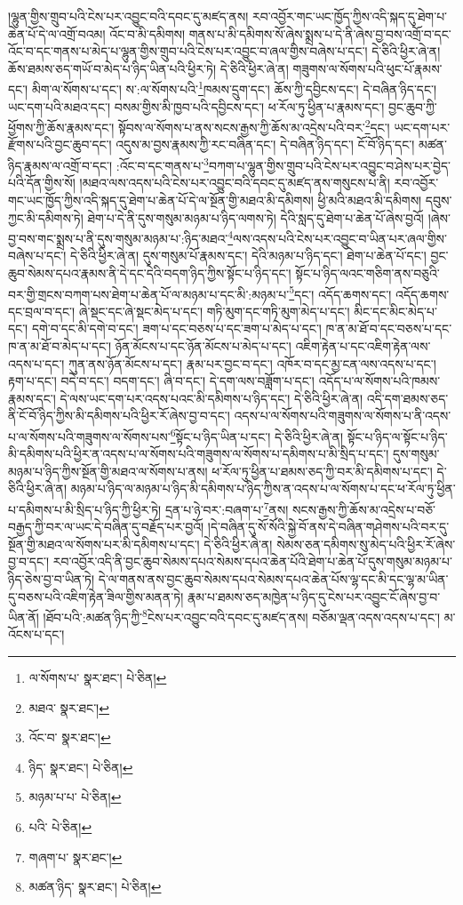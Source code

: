 །ལྷུན་གྱིས་གྲུབ་པའི་ངེས་པར་འབྱུང་བའི་དབང་དུ་མཛད་ནས། རབ་འབྱོར་གང་ཡང་ཁྱོད་ཀྱིས་འདི་སྐད་དུ་ཐེག་པ་ཆེན་པོ་དེ་ལ་འགྲོ་བའམ། འོང་བ་མི་དམིགས། གནས་པ་མི་དམིགས་སོ་ཞེས་སྨྲས་པ་དེ་ནི་ཞེས་བྱ་བས་འགྲོ་བ་དང་འོང་བ་དང་གནས་པ་མེད་པ་ལྷུན་གྱིས་གྲུབ་པའི་ངེས་པར་འབྱུང་བ་ཞལ་གྱིས་བཞེས་པ་དང་། དེ་ཅིའི་ཕྱིར་ཞེ་ན། ཆོས་ཐམས་ཅད་གཡོ་བ་མེད་པ་ཉིད་ཡིན་པའི་ཕྱིར་ཏེ། དེ་ཅིའི་ཕྱིར་ཞེ་ན། གཟུགས་ལ་སོགས་པའི་ཕུང་པོ་རྣམས་དང་། མིག་ལ་སོགས་པ་དང་། ས་:ལ་སོགས་པའི་\footnote{ལ་སོགས་པ་  སྣར་ཐང་།  པེ་ཅིན། }ཁམས་དྲུག་དང་། ཆོས་ཀྱི་དབྱིངས་དང་། དེ་བཞིན་ཉིད་དང་། ཡང་དག་པའི་མཐའ་དང་། བསམ་གྱིས་མི་ཁྱབ་པའི་དབྱིངས་དང་། ཕ་རོལ་ཏུ་ཕྱིན་པ་རྣམས་དང་། བྱང་ཆུབ་ཀྱི་ཕྱོགས་ཀྱི་ཆོས་རྣམས་དང་། སྟོབས་ལ་སོགས་པ་ནས་སངས་རྒྱས་ཀྱི་ཆོས་མ་འདྲེས་པའི་བར་\footnote{མཐའ་  སྣར་ཐང་། }དང་། ཡང་དག་པར་རྫོགས་པའི་བྱང་ཆུབ་དང་། འདུས་མ་བྱས་རྣམས་ཀྱི་རང་བཞིན་དང་། དེ་བཞིན་ཉིད་དང་། ངོ་བོ་ཉིད་དང་། མཚན་ཉིད་རྣམས་ལ་འགྲོ་བ་དང་། :འོང་བ་དང་གནས་པ་\footnote{འོང་བ་  སྣར་ཐང་། }བཀག་པ་ལྷུན་གྱིས་གྲུབ་པའི་ངེས་པར་འབྱུང་བ་ཤེས་པར་བྱེད་པའི་དོན་གྱིས་སོ། །མཐའ་ལས་འདས་པའི་ངེས་པར་འབྱུང་བའི་དབང་དུ་མཛད་ནས་གསུངས་པ་ནི། རབ་འབྱོར་གང་ཡང་ཁྱོད་ཀྱིས་འདི་སྐད་དུ་ཐེག་པ་ཆེན་པོ་དེ་ལ་སྔོན་གྱི་མཐའ་མི་དམིགས། ཕྱི་མའི་མཐའ་མི་དམིགས། དབུས་ཀྱང་མི་དམིགས་ཏེ། ཐེག་པ་དེ་ནི་དུས་གསུམ་མཉམ་པ་ཉིད་ལགས་ཏེ། དེའི་སླད་དུ་ཐེག་པ་ཆེན་པོ་ཞེས་བྱའོ། །ཞེས་བྱ་བས་གང་སྨྲས་པ་ནི་དུས་གསུམ་མཉམ་པ་:ཉིད་མཐའ་\footnote{ཉིད་  སྣར་ཐང་།  པེ་ཅིན། }ལས་འདས་པའི་ངེས་པར་འབྱུང་བ་ཡིན་པར་ཞལ་གྱིས་བཞེས་པ་དང་། དེ་ཅིའི་ཕྱིར་ཞེ་ན། དུས་གསུམ་པོ་རྣམས་དང་། དེའི་མཉམ་པ་ཉིད་དང་། ཐེག་པ་ཆེན་པོ་དང་། བྱང་ཆུབ་སེམས་དཔའ་རྣམས་ནི་དེ་དང་དེའི་བདག་ཉིད་ཀྱིས་སྟོང་པ་ཉིད་དང་། སྟོང་པ་ཉིད་ལའང་གཅིག་ནས་བཅུའི་བར་གྱི་གྲངས་བཀག་པས་ཐེག་པ་ཆེན་པོ་ལ་མཉམ་པ་དང་མི་:མཉམ་པ་\footnote{མཉམ་པ་པ་  པེ་ཅིན། }དང་། འདོད་ཆགས་དང་། འདོད་ཆགས་དང་བྲལ་བ་དང་། ཞེ་སྡང་དང་ཞེ་སྡང་མེད་པ་དང་། གཏི་མུག་དང་གཏི་མུག་མེད་པ་དང་། མིང་དང་མིང་མེད་པ་དང་། དགེ་བ་དང་མི་དགེ་བ་དང་། ཟག་པ་དང་བཅས་པ་དང་ཟག་པ་མེད་པ་དང་། ཁ་ན་མ་ཐོ་བ་དང་བཅས་པ་དང་ཁ་ན་མ་ཐོ་བ་མེད་པ་དང་། ཉོན་མོངས་པ་དང་ཉོན་མོངས་པ་མེད་པ་དང་། འཇིག་རྟེན་པ་དང་འཇིག་རྟེན་ལས་འདས་པ་དང་། ཀུན་ནས་ཉོན་མོངས་པ་དང་། རྣམ་པར་བྱང་བ་དང་། འཁོར་བ་དང་མྱ་ངན་ལས་འདས་པ་དང་། རྟག་པ་དང་། བདེ་བ་དང་། བདག་དང་། ཞི་བ་དང་། དེ་དག་ལས་བཟློག་པ་དང་། འདོད་པ་ལ་སོགས་པའི་ཁམས་རྣམས་དང་། དེ་ལས་ཡང་དག་པར་འདས་པའང་མི་དམིགས་པ་ཉིད་དང་། དེ་ཅིའི་ཕྱིར་ཞེ་ན། འདི་དག་ཐམས་ཅད་ནི་ངོ་བོ་ཉིད་ཀྱིས་མི་དམིགས་པའི་ཕྱིར་རོ་ཞེས་བྱ་བ་དང་། འདས་པ་ལ་སོགས་པའི་གཟུགས་ལ་སོགས་པ་ནི་འདས་པ་ལ་སོགས་པའི་གཟུགས་ལ་སོགས་པས་\footnote{པའི་  པེ་ཅིན། }སྟོང་པ་ཉིད་ཡིན་པ་དང་། དེ་ཅིའི་ཕྱིར་ཞེ་ན། སྟོང་པ་ཉིད་ལ་སྟོང་པ་ཉིད་མི་དམིགས་པའི་ཕྱིར་ན་འདས་པ་ལ་སོགས་པའི་གཟུགས་ལ་སོགས་པ་དམིགས་པ་མི་སྲིད་པ་དང་། དུས་གསུམ་མཉམ་པ་ཉིད་ཀྱིས་སྔོན་གྱི་མཐའ་ལ་སོགས་པ་ནས། ཕ་རོལ་ཏུ་ཕྱིན་པ་ཐམས་ཅད་ཀྱི་བར་མི་དམིགས་པ་དང་། དེ་ཅིའི་ཕྱིར་ཞེ་ན། མཉམ་པ་ཉིད་ལ་མཉམ་པ་ཉིད་མི་དམིགས་པ་ཉིད་ཀྱིས་ན་འདས་པ་ལ་སོགས་པ་དང་ཕ་རོལ་ཏུ་ཕྱིན་པ་དམིགས་པ་མི་སྲིད་པ་ཉིད་ཀྱི་ཕྱིར་ཏེ། དྲན་པ་ཉེ་བར་:བཞག་པ་\footnote{གཞག་པ་  སྣར་ཐང་། }ནས། སངས་རྒྱས་ཀྱི་ཆོས་མ་འདྲེས་པ་བཅོ་བརྒྱད་ཀྱི་བར་ལ་ཡང་དེ་བཞིན་དུ་བརྗོད་པར་བྱའོ། །དེ་བཞིན་དུ་སོ་སོའི་སྐྱེ་བོ་ནས་དེ་བཞིན་གཤེགས་པའི་བར་དུ་སྔོན་གྱི་མཐའ་ལ་སོགས་པར་མི་དམིགས་པ་དང་། དེ་ཅིའི་ཕྱིར་ཞེ་ན། སེམས་ཅན་དམིགས་སུ་མེད་པའི་ཕྱིར་རོ་ཞེས་བྱ་བ་དང་། རབ་འབྱོར་འདི་ནི་བྱང་ཆུབ་སེམས་དཔའ་སེམས་དཔའ་ཆེན་པོའི་ཐེག་པ་ཆེན་པོ་དུས་གསུམ་མཉམ་པ་ཉིད་ཅེས་བྱ་བ་ཡིན་ཏེ། དེ་ལ་གནས་ནས་བྱང་ཆུབ་སེམས་དཔའ་སེམས་དཔའ་ཆེན་པོས་ལྷ་དང་མི་དང་ལྷ་མ་ཡིན་དུ་བཅས་པའི་འཇིག་རྟེན་ཟིལ་གྱིས་མནན་ཏེ། རྣམ་པ་ཐམས་ཅད་མཁྱེན་པ་ཉིད་དུ་ངེས་པར་འབྱུང་ངོ་ཞེས་བྱ་བ་ཡིན་ནོ། །ཐོབ་པའི་:མཚན་ཉིད་ཀྱི་\footnote{མཚན་ཉིད་  སྣར་ཐང་།  པེ་ཅིན། }ངེས་པར་འབྱུང་བའི་དབང་དུ་མཛད་ནས། བཅོམ་ལྡན་འདས་འདས་པ་དང་། མ་འོངས་པ་དང་། 